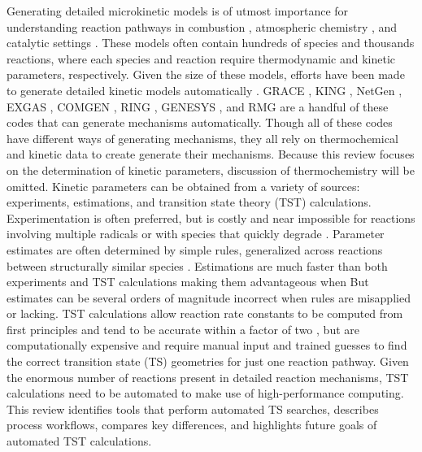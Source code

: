 \documentclass[preprint, 11pt]{elsarticle} %
\begin{document}
Generating detailed microkinetic models is of utmost importance for understanding reaction pathways in combustion \cite{vandevijver:2015}, atmospheric chemistry \cite{Vereecken:2012}, and catalytic settings \cite{STOLTZE:2000}.
These models often contain hundreds of species and thousands reactions, where each species and reaction require thermodynamic and kinetic parameters, respectively.
Given the size of these models, efforts have been made to generate detailed kinetic models automatically \cite{vandevijver:2015}. 
GRACE \cite{yoneda:1979}, KING \cite{maio:1992}, NetGen \cite{susnow:1997}, EXGAS \cite{warth:2000}, COMGEN \cite{ratkiewicz:2003}, RING \cite{rangarajan:2012}, GENESYS \cite{vandewiele:2012}, and RMG \cite{gao:2016} are a handful of these codes that can generate mechanisms automatically.
Though all of these codes have different ways of generating mechanisms, they all rely on thermochemical and kinetic data to create generate their mechanisms. 
Because this review focuses on the determination of kinetic parameters, discussion of thermochemistry will be omitted.
Kinetic parameters can be obtained from a variety of sources: experiments, estimations, and transition state theory (TST) calculations.
Experimentation is often preferred, but is costly and near impossible for reactions involving multiple radicals or with species that quickly degrade \cite{Sabbe:2005}.
Parameter estimates are often determined by simple rules, generalized across reactions between structurally similar species \cite{Curran:1998bx, cai:2014}. 
Estimations are much faster than both experiments and TST calculations making them advantageous when 
But estimates can be several orders of magnitude incorrect when rules are misapplied or lacking.
TST calculations allow reaction rate constants to be computed from first principles and tend to be accurate within a factor of two \cite{fernandezramos:2006, Klippenstein:2017eu}, but are computationally expensive and require manual input and trained guesses to find the correct transition state (TS) geometries for just one reaction pathway. 
Given the enormous number of reactions present in detailed reaction mechanisms, TST calculations need to be automated to make use of high-performance computing.
This review identifies tools that perform automated TS searches, describes process workflows, compares key differences, and highlights future goals of automated TST calculations.
\end{document}
